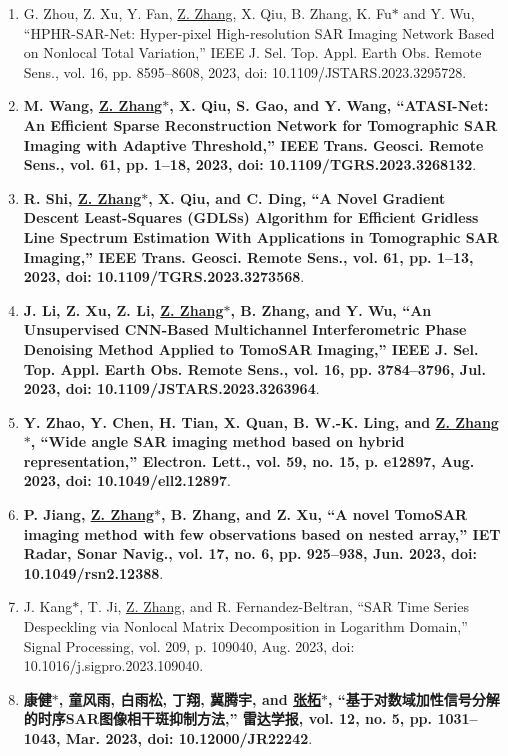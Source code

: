 \documentclass[paper=a4,fontsize=11pt]{scrartcl}
\begin{document}
\begin{enumerate}
\item G. Zhou, Z. Xu, Y. Fan, \underline{Z. Zhang}, X. Qiu, B. Zhang, K. Fu$\ast$ and Y. Wu, ``HPHR-SAR-Net: Hyper-pixel High-resolution SAR Imaging Network Based on Nonlocal Total Variation,'' IEEE J. Sel. Top. Appl. Earth Obs. Remote Sens., vol. 16, pp. 8595–8608, 2023, doi: 10.1109/JSTARS.2023.3295728.

\item \textbf{M. Wang, \underline{Z. Zhang$\ast$}, X. Qiu, S. Gao, and Y. Wang, ``ATASI-Net: An Efficient Sparse Reconstruction Network for Tomographic SAR Imaging with Adaptive Threshold,'' IEEE Trans. Geosci. Remote Sens., vol. 61, pp. 1–18, 2023, doi: 10.1109/TGRS.2023.3268132}.	
	
\item \textbf{R. Shi, \underline{Z. Zhang$\ast$}, X. Qiu, and C. Ding, ``A Novel Gradient Descent Least-Squares (GDLSs) Algorithm for Efficient Gridless Line Spectrum Estimation With Applications in Tomographic SAR Imaging,'' IEEE Trans. Geosci. Remote Sens., vol. 61, pp. 1–13, 2023, doi: 10.1109/TGRS.2023.3273568}.

\item \textbf{J. Li, Z. Xu, Z. Li, \underline{Z. Zhang$\ast$}, B. Zhang, and Y. Wu, ``An Unsupervised CNN-Based Multichannel Interferometric Phase Denoising Method Applied to TomoSAR Imaging,'' IEEE J. Sel. Top. Appl. Earth Obs. Remote Sens., vol. 16, pp. 3784–3796, Jul. 2023, doi: 10.1109/JSTARS.2023.3263964}.

\item \textbf{Y. Zhao, Y. Chen, H. Tian, X. Quan, B. W.-K. Ling, and \underline{Z. Zhang$\ast$}, ``Wide angle SAR imaging method based on hybrid representation,'' Electron. Lett., vol. 59, no. 15, p. e12897, Aug. 2023, doi: 10.1049/ell2.12897}.

\item \textbf{P. Jiang, \underline{Z. Zhang$\ast$}, B. Zhang, and Z. Xu, ``A novel TomoSAR imaging method with few observations based on nested array,'' IET Radar, Sonar Navig., vol. 17, no. 6, pp. 925–938, Jun. 2023, doi: 10.1049/rsn2.12388}.

\item J. Kang$\ast$, T. Ji, \underline{Z. Zhang}, and R. Fernandez-Beltran, ``SAR Time Series Despeckling via Nonlocal Matrix Decomposition in Logarithm Domain,'' Signal Processing, vol. 209, p. 109040, Aug. 2023, doi: 10.1016/j.sigpro.2023.109040.

\item \textbf{康健$\ast$, 童风雨, 白雨松, 丁翔, 冀腾宇, and \underline{张柘$\ast$}, ``基于对数域加性信号分解的时序SAR图像相干斑抑制方法,'' 雷达学报, vol. 12, no. 5, pp. 1031–1043, Mar. 2023, doi: 10.12000/JR22242}.


\end{enumerate}
\end{document}
